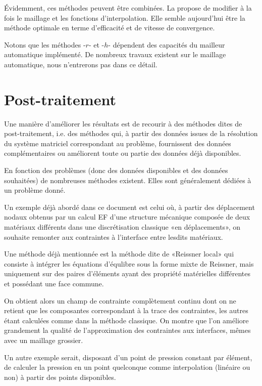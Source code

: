 \medskip
Évidemment, ces méthodes peuvent être combinées. La  propose de modifier à la fois le maillage et
les fonctions d'interpolation. Elle semble aujourd'hui être la méthode optimale en terme
d'efficacité et de vitesse de convergence.

Notons que les méthodes -$r$- et -$h$- dépendent des capacités du mailleur automatique implémenté. De nombreux travaux existent sur le maillage automatique, nous n'entrerons pas dans ce détail.

\medskip
\section{Post-traitement}\label{Sec-PT}

Une manière d'améliorer les résultats est de recourir à des méthodes dites de post-traitement, i.e. des méthodes qui, à partir des données issues de la résolution du système matriciel correspondant au problème, fournissent des données complémentaires ou améliorent toute ou partie des données déjà disponibles.

En fonction des problèmes (donc des données disponibles et des données souhaitées) de nombreuses méthodes existent. Elles sont généralement dédiées à un problème donné.

\medskip
Un exemple déjà abordé dans ce document est celui où, à partir des déplacement nodaux obtenus par un calcul EF d'une structure mécanique composée de deux matériaux différents dans une discrétisation classique «en déplacements», on souhaite remonter aux contraintes à l'interface entre lesdits matériaux.

Une méthode déjà mentionnée est la méthode dite de «Reissner local» qui consiste à intégrer les équations d'équlibre sous la forme mixte de Reissner, mais uniquement sur des paires d'éléments ayant des propriété matérielles différentes et possédant une face commune.

On obtient alors un champ de contrainte complètement continu dont on ne retient que les composantes correspondant à la trace des contraintes, les autres étant calculées comme dans la méthode classique. On montre que l'on améliore grandement la qualité de l'approximation des contraintes aux interfaces, mêmes avec un maillage grossier.

\medskip
Un autre exemple serait, disposant d'un point de pression constant par élément, de calculer la pression en un point quelconque comme interpolation (linéaire ou non) à partir des points disponibles.

